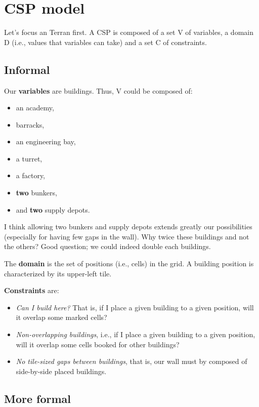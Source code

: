 \documentclass[a4paper,11pt]{article}
\begin{document}
\section{CSP model}

Let's  focus  an Terran  first.  A  CSP is  composed  of  a  set V  of
variables, a domain D (i.e., values that variables can take) and a set C
of constraints.

\subsection{Informal}

Our {\bf variables} are buildings. Thus, V could be composed of:
\begin{itemize}
\item an academy,
\item barracks,
\item an engineering bay,
\item a turret,
\item a factory,
\item {\bf two} bunkers,
\item and {\bf two} supply depots.
\end{itemize}

I think  allowing two  bunkers and supply  depots extends  greatly our
possibilities (especially for having few  gaps in the wall). Why twice
these buildings  and not  the others? Good  question; we  could indeed
double each buildings.

The  {\bf  domain}  is the  set  of  positions  (i.e., cells)  in  the
grid. A building position is characterized by its upper-left tile.

{\bf Constraints} are:
\begin{itemize}
\item {\em Can I build here?} That  is, if I place a given building to
  a given position, will it overlap some marked cells?
\item {\em Non-overlapping buildings}, i.e., if I place a given building to
  a  given position,  will  it  overlap some  cells  booked for  other
  buildings?
\item {\em  No tile-sized gaps  between buildings}, that is,  our wall
  must by composed of side-by-side placed buildings.
\end{itemize}

\subsection{More formal}
\end{document}
